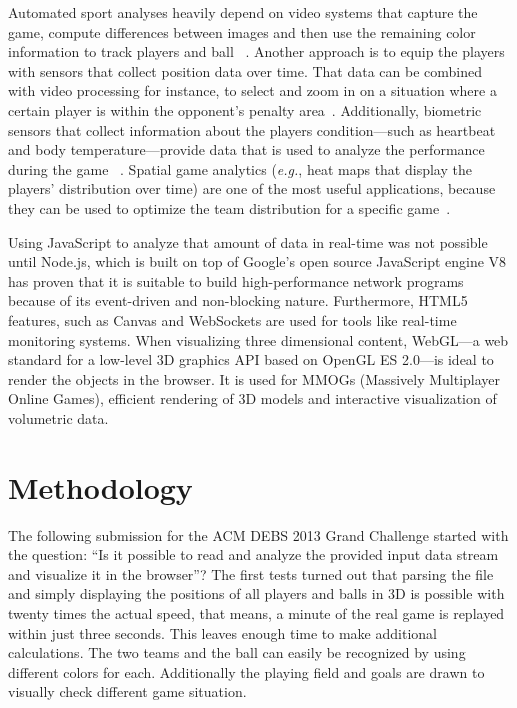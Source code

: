 \documentclass{sig-alternate}
\begin{document}
Automated sport analyses heavily depend on video systems
that capture the game, compute differences between images
and then use the remaining color information
to track players and ball%
~\cite{Huang:2007:PBD:1776594.1776646,Liang:2005:SBD:2163110.2163186}.
Another approach is to equip the players with sensors
that collect position data over time.
That data can be combined with video processing for instance,
to select and zoom in on a situation where a certain player
is within the opponent's penalty area~\cite{ragnar2012football}.
Additionally, biometric sensors that collect information
about the players condition---such as heartbeat
and body temperature---provide data that is used
to analyze the performance during the game~%
\cite{alonso2010sportstelemetry}.
Spatial game analytics (\emph{e.g.}, heat maps
that display the players’ distribution over time)
are one of the most useful applications,
because they can be used to optimize the team distribution
for a specific game~\cite{elnasr2013spatialgame}.

Using JavaScript to analyze that amount of data in real-time
was not possible until Node.js,
which is built on top of Google's open source JavaScript engine V8
has proven that it is suitable to build
high-performance network programs
because of its event-driven and non-blocking nature.
Furthermore, HTML5 features, such as Canvas and WebSockets
are used for tools like real-time monitoring systems.
When visualizing three dimensional content,
WebGL---a web standard for a low-level 3D graphics API
based on OpenGL ES 2.0---is ideal to render the objects
in the browser.
It is used for MMOGs (Massively Multiplayer Online Games),
efficient rendering of 3D models
and interactive visualization of volumetric data.

\section{Methodology}
\label{sec:methodology}

The following submission for the ACM DEBS 2013 Grand Challenge
started with the question: ``Is it possible to read and analyze
the provided input data stream and visualize it in the browser''?
The first tests turned out that parsing the file
and simply displaying the positions of all players
and balls in 3D is possible with twenty times the actual speed,
that means, a minute of the real game is replayed
within just three seconds.
This leaves enough time to make additional calculations.
The two teams and the ball can easily be recognized
by using different colors for each.
Additionally the playing field and goals are drawn
to visually check different game situation.
\end{document}
